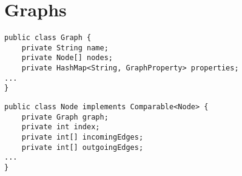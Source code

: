 
\section{Graphs}
\label{sec:graphs}




\begin{lstlisting}[label={lst:graph},caption={Basic graph object}]
public class Graph {
	private String name;
	private Node[] nodes;
	private HashMap<String, GraphProperty> properties;
...
}
\end{lstlisting}


\begin{lstlisting}[label={lst:node},caption={Basic node object}]
public class Node implements Comparable<Node> {
	private Graph graph;
	private int index;
	private int[] incomingEdges;
	private int[] outgoingEdges;
...
}
\end{lstlisting}